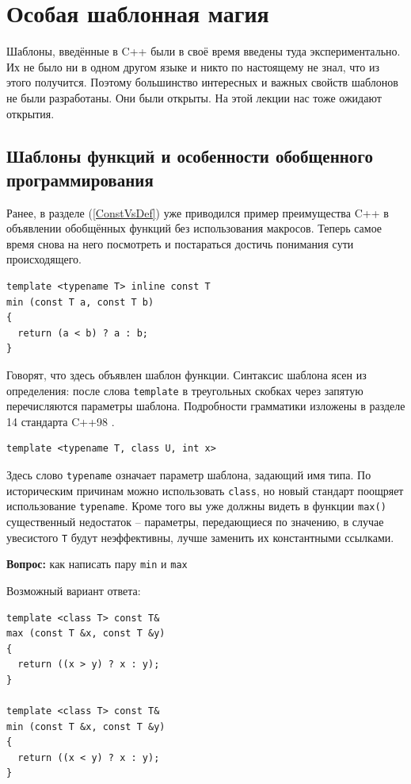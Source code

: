 \documentclass[a4paper,12pt,oneside]{article}
\begin{document}
\pagebreak
\section{Особая шаблонная магия}

Шаблоны, введённые в C++ были в своё время введены туда экспериментально. Их не было ни в одном другом языке и никто по настоящему не знал, что из этого получится. Поэтому большинство интересных и важных свойств шаблонов не были разработаны. Они были открыты. На этой лекции нас тоже ожидают открытия.

\subsection{Шаблоны функций и особенности обобщенного программирования}

Ранее, в разделе (\ref{ConstVsDef}) уже приводился пример преимущества C++ в объявлении обобщённых функций без использования макросов. Теперь самое время снова на него посмотреть и постараться достичь понимания сути происходящего.

\begin{lstlisting}
template <typename T> inline const T
min (const T a, const T b)
{
  return (a < b) ? a : b;
}
\end{lstlisting}

Говорят, что здесь объявлен шаблон функции. Синтаксис шаблона ясен из определения: после слова \lstinline!template! в треугольных скобках через запятую перечисляются параметры шаблона. Подробности грамматики изложены в разделе 14 стандарта C++98 \cite{stdcpp98}.

\begin{lstlisting}
template <typename T, class U, int x>
\end{lstlisting}

Здесь слово \lstinline!typename! означает параметр шаблона, задающий имя типа. По историческим причинам можно использовать \lstinline!class!, но новый стандарт поощряет использование \lstinline!typename!. Кроме того вы уже должны видеть в функции \lstinline!max()! существенный недостаток – параметры, передающиеся по значению, в случае увесистого \lstinline!T! будут неэффективны, лучше заменить их константными ссылками.

\textbf{Вопрос:} как написать пару \lstinline!min! и \lstinline!max!

Возможный вариант ответа:

\begin{lstlisting}
template <class T> const T&
max (const T &x, const T &y)
{
  return ((x > y) ? x : y);
}

template <class T> const T&
min (const T &x, const T &y)
{
  return ((x < y) ? x : y);
}
\end{lstlisting}
\end{document}

